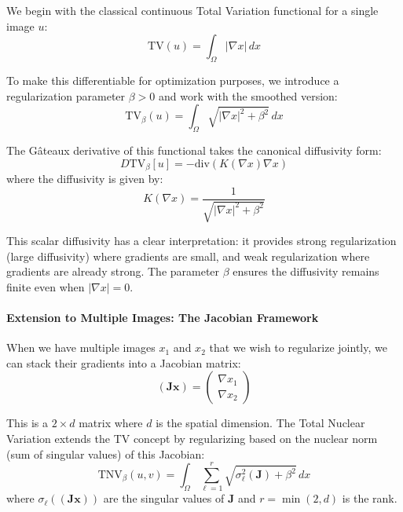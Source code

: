 We begin with the classical continuous Total Variation functional for a single image $u$:
\begin{equation}
\text{TV}(u) = \int_\Omega |\nabla x| \, dx
\end{equation}

To make this differentiable for optimization purposes, we introduce a regularization parameter $\beta > 0$ and work with the smoothed version:
\begin{equation}
\text{TV}_\beta(u) = \int_\Omega \sqrt{|\nabla x|^2 + \beta^2} \, dx
\end{equation}

The Gâteaux derivative of this functional takes the canonical diffusivity form:
\begin{equation}
D\text{TV}_\beta[u] = -\text{div}(K(\nabla x) \nabla x)
\end{equation}
where the diffusivity is given by:
\begin{equation}
K(\nabla x) = \frac{1}{\sqrt{|\nabla x|^2 + \beta^2}}
\end{equation}

This scalar diffusivity has a clear interpretation: it provides strong regularization (large diffusivity) where gradients are small, and weak regularization where gradients are already strong. The parameter $\beta$ ensures the diffusivity remains finite even when $|\nabla x| = 0$.

\paragraph{Extension to Multiple Images: The Jacobian Framework}

When we have multiple images $x_1$ and $x_2$ that we wish to regularize jointly, we can stack their gradients into a Jacobian matrix:
\begin{equation}
(\mathbf{J} \mathbf{x}) = \begin{pmatrix} \nabla x_1 \\ \nabla x_2 \end{pmatrix}
\end{equation}

This is a $2 \times d$ matrix where $d$ is the spatial dimension. The Total Nuclear Variation extends the TV concept by regularizing based on the nuclear norm (sum of singular values) of this Jacobian:
\begin{equation}
\text{TNV}_\beta(u,v) = \int_\Omega \sum_{\ell=1}^r \sqrt{\sigma_\ell^2(\mathbf{J}) + \beta^2} \, dx
\end{equation}
where $\sigma_\ell((\mathbf{J} \mathbf{x}))$ are the singular values of $\mathbf{J}$ and $r = \min(2,d)$ is the rank.

